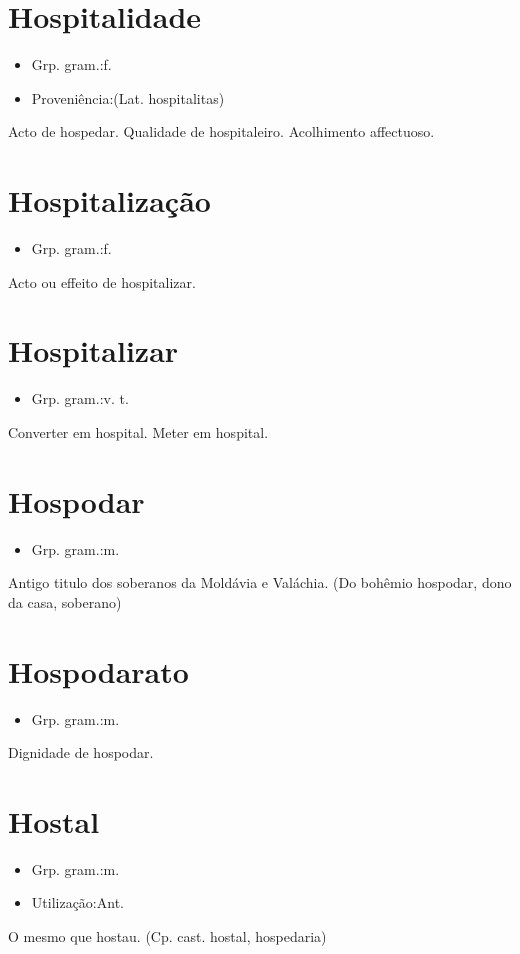 \documentclass{article}
\begin{document}
\section{Hospitalidade}
\begin{itemize}
\item {Grp. gram.:f.}
\end{itemize}
\begin{itemize}
\item {Proveniência:(Lat. \textunderscore hospitalitas\textunderscore )}
\end{itemize}
Acto de hospedar.
Qualidade de hospitaleiro.
Acolhimento affectuoso.
\section{Hospitalização}
\begin{itemize}
\item {Grp. gram.:f.}
\end{itemize}
Acto ou effeito de hospitalizar.
\section{Hospitalizar}
\begin{itemize}
\item {Grp. gram.:v. t.}
\end{itemize}
Converter em hospital.
Meter em hospital.
\section{Hospodar}
\begin{itemize}
\item {Grp. gram.:m.}
\end{itemize}
Antigo titulo dos soberanos da Moldávia e Valáchia.
(Do bohêmio \textunderscore hospodar\textunderscore , dono da casa, soberano)
\section{Hospodarato}
\begin{itemize}
\item {Grp. gram.:m.}
\end{itemize}
Dignidade de hospodar.
\section{Hostal}
\begin{itemize}
\item {Grp. gram.:m.}
\end{itemize}
\begin{itemize}
\item {Utilização:Ant.}
\end{itemize}
O mesmo que \textunderscore hostau\textunderscore .
(Cp. cast. \textunderscore hostal\textunderscore , hospedaria)
\end{document}
